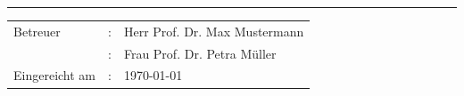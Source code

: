 {\begin{center}

\hrule
\vspace{1cm}
{\fontsize{12pt}{12} \selectfont
  \begin{tabular}{lcl}
    Betreuer       &:& Herr Prof. Dr. Max Mustermann\\[0.5ex]
                   &:& Frau Prof. Dr. Petra M\"uller\\[0.5ex]
    Eingereicht am &:& \today
  \end{tabular}
}

\end{center}
}
